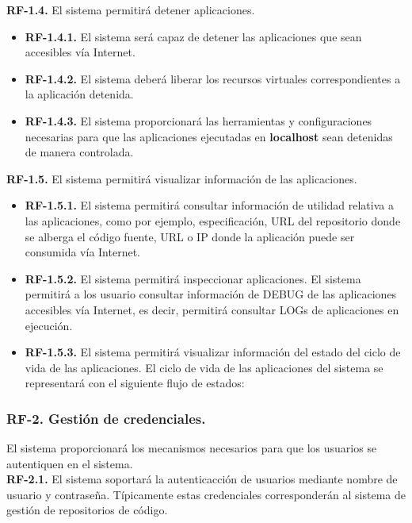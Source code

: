 \documentclass[a4paper,11pt]{book}
\begin{document}
	
\textbf{RF-1.4.} El sistema permitirá detener aplicaciones.

\begin{itemize}
 \item  \textbf{RF-1.4.1.} El sistema será capaz de detener las aplicaciones que sean accesibles vía Internet. 
  \item  \textbf{RF-1.4.2.} El sistema deberá liberar los recursos virtuales correspondientes a la aplicación detenida.  
  \item  \textbf{RF-1.4.3.} El sistema proporcionará las herramientas  y configuraciones necesarias para que las aplicaciones ejecutadas en \textbf{localhost}  sean detenidas de manera controlada. \\
\end{itemize}
	
\textbf{RF-1.5.} El sistema permitirá visualizar información de las aplicaciones.

\begin{itemize}
\item \textbf{RF-1.5.1.} El sistema permitirá consultar  información de utilidad relativa a las aplicaciones,  como por ejemplo, especificación, URL del repositorio donde se alberga el código fuente, URL o IP donde la aplicación puede ser consumida vía Internet. 
\item \textbf{RF-1.5.2.} El sistema permitirá inspeccionar aplicaciones. El sistema permitirá a los usuario consultar información de DEBUG de las aplicaciones accesibles vía Internet, es decir, permitirá consultar LOGs de aplicaciones en ejecución. 
\item \textbf{RF-1.5.3.} El sistema permitirá visualizar información del estado del ciclo de vida de las aplicaciones. El ciclo de vida de las aplicaciones del sistema se representará con el siguiente flujo de estados:\\
\end{itemize}
	

\subsubsection { \textbf{ RF-2. Gestión de credenciales.}} El sistema proporcionará los mecanismos necesarios para que los usuarios se autentiquen en el sistema. \\
	
			
\textbf{RF-2.1.} El sistema  soportará la autenticacción de usuarios mediante nombre de usuario y contraseña. Típicamente estas credenciales corresponderán al sistema de gestión de repositorios de código. 
\end{document}
